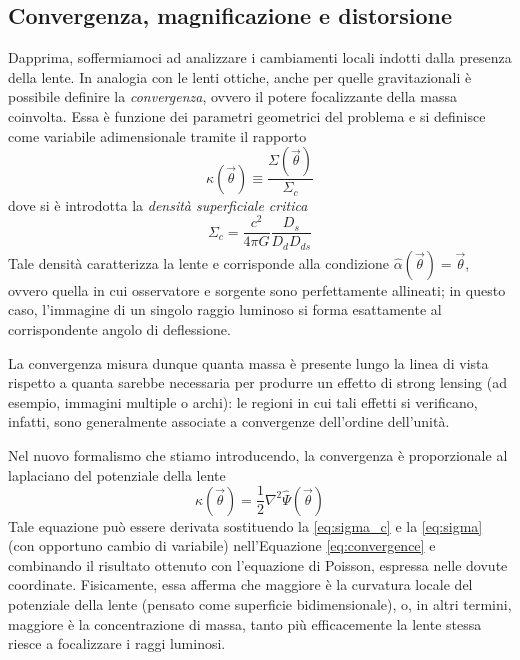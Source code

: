 \subsection{Convergenza, magnificazione e distorsione}
\label{sez:convergence, magnification, shear}
Dapprima, soffermiamoci ad analizzare i cambiamenti locali indotti dalla presenza della lente. 
In analogia con le lenti ottiche, anche per quelle gravitazionali è possibile definire la \emph{convergenza}, ovvero il potere focalizzante della massa coinvolta. Essa è funzione dei parametri geometrici del problema e si definisce come variabile adimensionale tramite il rapporto
\begin{equation}
    \kappa(\vec \theta)\equiv \frac{\Sigma(\vec \theta)}{\Sigma_c}
    \label{eq:convergence}
\end{equation}
dove si è introdotta la \emph{densità superficiale critica}
\begin{equation}
    \Sigma_c=\frac{c^2}{4\pi G}\frac{D_s}{D_dD_{ds}}
    \label{eq:sigma_c}
\end{equation}
Tale densità caratterizza la lente e corrisponde alla condizione $\hat \alpha(\vec\theta)=\vec\theta$, ovvero quella in cui osservatore e sorgente sono perfettamente allineati; in questo caso, l'immagine di un singolo raggio luminoso si forma esattamente al corrispondente angolo di deflessione.

La convergenza misura dunque quanta massa è presente lungo la linea di vista rispetto a quanta sarebbe necessaria per produrre un effetto di strong lensing (ad esempio, immagini multiple o archi): le regioni in cui tali effetti si verificano, infatti, sono generalmente associate a convergenze dell'ordine dell'unità.

Nel nuovo formalismo che stiamo introducendo, la convergenza è proporzionale al laplaciano del potenziale della lente 
\begin{equation}
    \kappa(\vec\theta)=\frac{1}{2}\nabla^2\hat\Psi(\vec\theta)
    \label{eq:conv_pot}
\end{equation}
Tale equazione può essere derivata sostituendo la \ref{eq:sigma_c} e la \ref{eq:sigma} (con opportuno cambio di variabile) nell'Equazione \ref{eq:convergence} e combinando il risultato ottenuto con l'equazione di Poisson, espressa nelle dovute coordinate. Fisicamente, essa afferma che maggiore è la curvatura locale del potenziale della lente (pensato come superficie bidimensionale), o, in altri termini, maggiore è la concentrazione di massa, tanto più efficacemente la lente stessa riesce a focalizzare  i raggi luminosi. 

